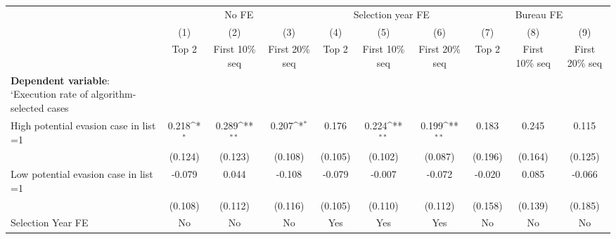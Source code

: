 {
\def\sym#1{\ifmmode^{#1}\else\(^{#1}\)\fi}
\begin{tabular}{l*{9}{c}}
\toprule
            &\multicolumn{3}{c}{No FE}                                        &\multicolumn{3}{c}{Selection year FE}                            &\multicolumn{3}{c}{Bureau FE}                                    \\\cmidrule(lr){2-4}\cmidrule(lr){5-7}\cmidrule(lr){8-10}
            &\multicolumn{1}{c}{(1)}&\multicolumn{1}{c}{(2)}&\multicolumn{1}{c}{(3)}&\multicolumn{1}{c}{(4)}&\multicolumn{1}{c}{(5)}&\multicolumn{1}{c}{(6)}&\multicolumn{1}{c}{(7)}&\multicolumn{1}{c}{(8)}&\multicolumn{1}{c}{(9)}\\
            &\multicolumn{1}{c}{Top 2}&\multicolumn{1}{c}{First 10\% seq}&\multicolumn{1}{c}{First 20\% seq}&\multicolumn{1}{c}{Top 2}&\multicolumn{1}{c}{First 10\% seq}&\multicolumn{1}{c}{First 20\% seq}&\multicolumn{1}{c}{Top 2}&\multicolumn{1}{c}{First 10\% seq}&\multicolumn{1}{c}{First 20\% seq}\\
\midrule
\textbf{Dependent variable}: `Execution rate of algorithm-selected cases&                     &                     &                     &                     &                     &                     &                     &                     &                     \\
\addlinespace
High potential evasion case in list =1&       0.218\sym{*}  &       0.289\sym{**} &       0.207\sym{*}  &       0.176         &       0.224\sym{**} &       0.199\sym{**} &       0.183         &       0.245         &       0.115         \\
            &     (0.124)         &     (0.123)         &     (0.108)         &     (0.105)         &     (0.102)         &     (0.087)         &     (0.196)         &     (0.164)         &     (0.125)         \\
\addlinespace
Low potential evasion case in list =1&      -0.079         &       0.044         &      -0.108         &      -0.079         &      -0.007         &      -0.072         &      -0.020         &       0.085         &      -0.066         \\
            &     (0.108)         &     (0.112)         &     (0.116)         &     (0.105)         &     (0.110)         &     (0.112)         &     (0.158)         &     (0.139)         &     (0.185)         \\
\midrule
Selection Year FE&          No         &          No         &          No         &         Yes         &         Yes         &         Yes         &          No         &          No         &          No         \\

\end{tabular}}
